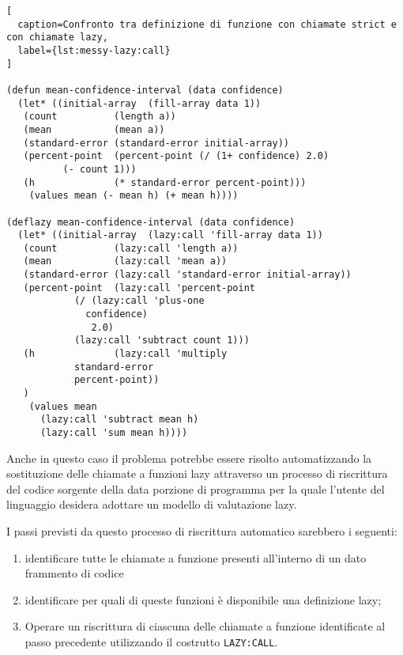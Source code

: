 \begin{lstlisting}[
  caption=Confronto tra definizione di funzione con chiamate strict e con chiamate lazy,
  label={lst:messy-lazy:call}
]

(defun mean-confidence-interval (data confidence)
  (let* ((initial-array  (fill-array data 1))
   (count          (length a))
   (mean           (mean a))
   (standard-error (standard-error initial-array))
   (percent-point  (percent-point (/ (1+ confidence) 2.0)
          (- count 1)))
   (h              (* standard-error percent-point)))
    (values mean (- mean h) (+ mean h))))

(deflazy mean-confidence-interval (data confidence)
  (let* ((initial-array  (lazy:call 'fill-array data 1))
   (count          (lazy:call 'length a))
   (mean           (lazy:call 'mean a))
   (standard-error (lazy:call 'standard-error initial-array))
   (percent-point  (lazy:call 'percent-point
            (/ (lazy:call 'plus-one
              confidence)
               2.0)
            (lazy:call 'subtract count 1)))
   (h              (lazy:call 'multiply
            standard-error
            percent-point))
   )
    (values mean
      (lazy:call 'subtract mean h)
      (lazy:call 'sum mean h))))

\end{lstlisting}

Anche in questo caso il problema potrebbe essere risolto automatizzando la sostituzione delle chiamate a funzioni lazy attraverso un processo di riscrittura del codice sorgente della data porzione di programma per la quale l'utente del linguaggio desidera adottare un modello di valutazione lazy.

I passi previsti da questo processo di riscrittura automatico sarebbero i seguenti:

\begin{enumerate}

\item identificare tutte le chiamate a funzione presenti all'interno di un dato frammento di codice

\item identificare per quali di queste funzioni è disponibile una definizione lazy;

\item Operare un riscrittura di ciascuna delle chiamate a funzione identificate al passo precedente utilizzando il costrutto \texttt{LAZY:CALL}.

\end{enumerate}

